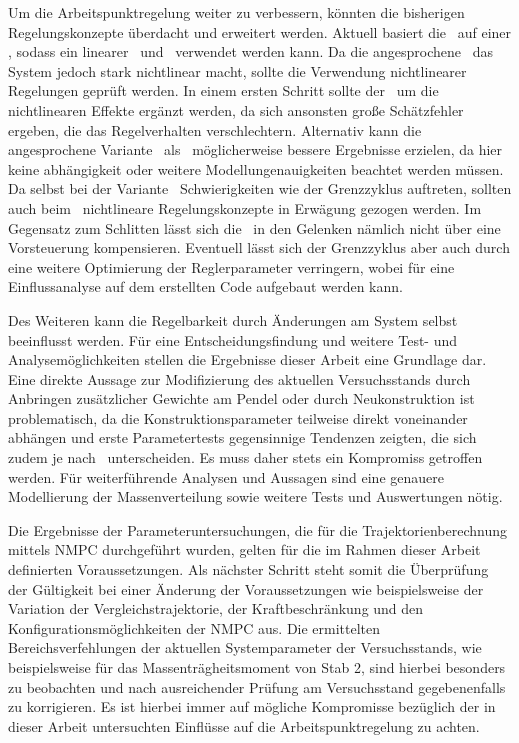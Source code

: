 Um die Arbeitspunktregelung weiter zu verbessern, könnten die bisherigen Regelungskonzepte überdacht und erweitert werden.
Aktuell basiert die \aprg\ auf einer \lin, sodass ein linearer \zsr\ und \beob\ verwendet werden kann.
Da die angesprochene \crb\ das System jedoch stark nichtlinear macht, sollte die Verwendung nichtlinearer Regelungen geprüft werden.
In einem ersten Schritt sollte der \beob\ um die nichtlinearen Effekte ergänzt werden, da sich ansonsten große Schätzfehler ergeben, die das Regelverhalten verschlechtern.
Alternativ kann die angesprochene Variante \diff\ als \ze\ möglicherweise bessere Ergebnisse erzielen, da hier keine \ap abhängigkeit oder weitere Modellungenauigkeiten beachtet werden müssen.
Da selbst bei der Variante \zm\ Schwierigkeiten wie der Grenzzyklus auftreten, sollten auch beim \zsr\ nichtlineare Regelungskonzepte in Erwägung gezogen werden.
Im Gegensatz zum Schlitten lässt sich die \crb\ in den Gelenken nämlich nicht über eine Vorsteuerung kompensieren.
Eventuell lässt sich der Grenzzyklus aber auch durch eine weitere Optimierung der Reglerparameter verringern, wobei für eine Einflussanalyse auf dem erstellten Code aufgebaut werden kann.

Des Weiteren kann die Regelbarkeit durch Änderungen am System selbst beeinflusst werden.
Für eine Entscheidungsfindung und weitere Test- und Analysemöglichkeiten stellen die Ergebnisse dieser Arbeit eine Grundlage dar.
Eine direkte Aussage zur Modifizierung des aktuellen Versuchsstands durch Anbringen zusätzlicher Gewichte am Pendel oder durch Neukonstruktion  ist problematisch, da die Konstruktionsparameter teilweise direkt voneinander abhängen und erste Parametertests gegensinnige Tendenzen zeigten, die sich zudem je nach \ap\ unterscheiden.
Es muss daher stets ein Kompromiss getroffen werden.
Für weiterführende Analysen und Aussagen sind eine genauere Modellierung der Massenverteilung sowie weitere Tests und Auswertungen nötig.

Die Ergebnisse der Parameteruntersuchungen, die für die Trajektorienberechnung mittels NMPC durchgeführt wurden, gelten für die im Rahmen dieser Arbeit definierten Voraussetzungen. %
Als nächster Schritt steht somit die Überprüfung der Gültigkeit bei einer Änderung der Voraussetzungen wie beispielsweise der Variation der Vergleichstrajektorie, der Kraftbeschränkung und den Konfigurationsmöglichkeiten der NMPC aus. Die ermittelten Bereichsverfehlungen der aktuellen Systemparameter der Versuchsstands, wie beispielsweise für das Massenträgheitsmoment von Stab 2, sind hierbei besonders zu beobachten und nach ausreichender Prüfung am Versuchsstand gegebenenfalls zu korrigieren. Es ist hierbei immer auf mögliche Kompromisse bezüglich der in dieser Arbeit untersuchten Einflüsse auf die Arbeitspunktregelung zu achten.

